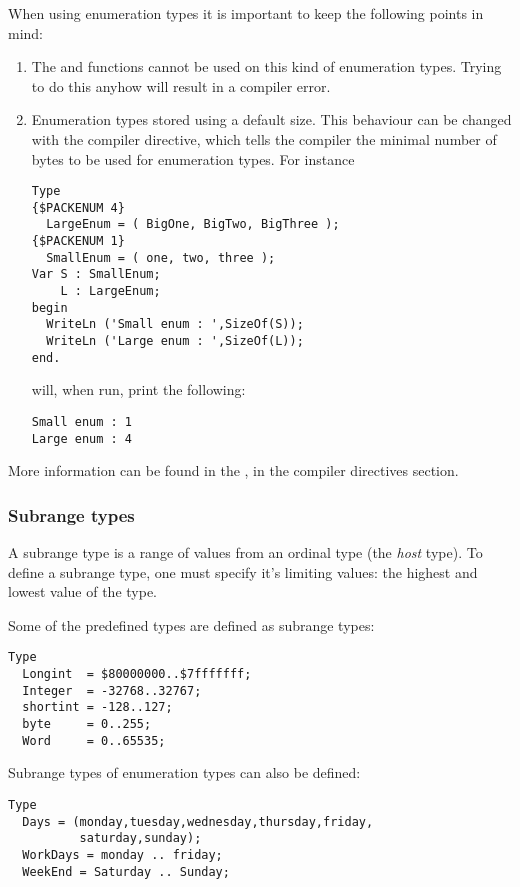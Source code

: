 When using enumeration types it is important to keep the following points
in mind:
\begin{enumerate}
\item The  and  functions cannot be used on
this kind of enumeration types. Trying to do this anyhow will result in a
compiler error.
\item Enumeration types stored using a default size. This behaviour can be changed
with the  compiler directive, which
tells the compiler the minimal number of bytes to be used for enumeration
types.
For instance
\begin{verbatim}
Type
{$PACKENUM 4}
  LargeEnum = ( BigOne, BigTwo, BigThree );
{$PACKENUM 1}
  SmallEnum = ( one, two, three );
Var S : SmallEnum;
    L : LargeEnum;
begin
  WriteLn ('Small enum : ',SizeOf(S));
  WriteLn ('Large enum : ',SizeOf(L));
end.
\end{verbatim}
will, when run, print the following:
\begin{verbatim}
Small enum : 1
Large enum : 4
\end{verbatim}
\end{enumerate}
More information can be found in the \progref, in the compiler directives
section.
\subsubsection{Subrange types}
A subrange type is a range of values from an ordinal type (the {\em host}
type). To define a subrange type, one must specify it's limiting values: the
highest and lowest value of the type.

Some of the predefined  types are defined as subrange types:
\begin{verbatim}
Type
  Longint  = $80000000..$7fffffff;
  Integer  = -32768..32767;
  shortint = -128..127;
  byte     = 0..255;
  Word     = 0..65535;
\end{verbatim}
Subrange types of enumeration types can also be defined:
\begin{verbatim}
Type
  Days = (monday,tuesday,wednesday,thursday,friday,
          saturday,sunday);
  WorkDays = monday .. friday;
  WeekEnd = Saturday .. Sunday;
\end{verbatim}
